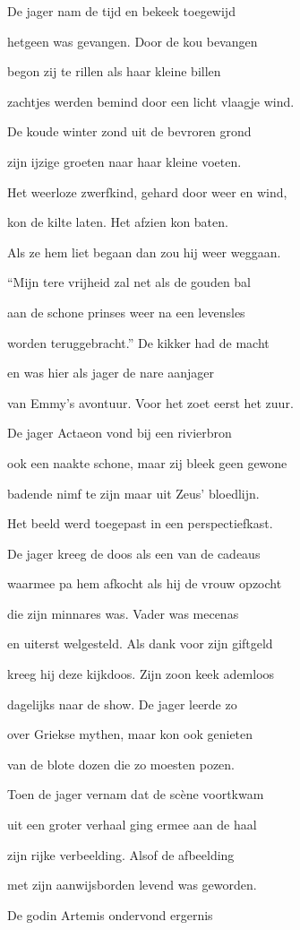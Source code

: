 De jager nam de tijd
en bekeek toegewijd

hetgeen was gevangen.
Door de kou bevangen

begon zij te rillen
als haar kleine billen

zachtjes werden bemind
door een licht vlaagje wind.

De koude winter zond
uit de bevroren grond

zijn ijzige groeten
naar haar kleine voeten.

Het weerloze zwerfkind,
gehard door weer en wind,

kon de kilte laten.
Het afzien kon baten.

Als ze hem liet begaan
dan zou hij weer weggaan.

“Mijn tere vrijheid zal
net als de gouden bal

aan de schone prinses
weer na een levensles

worden teruggebracht.”
De kikker had de macht

en was hier als jager
de nare aanjager

van Emmy’s avontuur.
Voor het zoet eerst het zuur.

De jager Actaeon
vond bij een rivierbron

ook een naakte schone,
maar zij bleek geen gewone

badende nimf te zijn
maar uit Zeus’ bloedlijn.

Het beeld werd toegepast
in een perspectiefkast.

De jager kreeg de doos
als een van de cadeaus

waarmee pa hem afkocht
als hij de vrouw opzocht

die zijn minnares was.
Vader was mecenas

en uiterst welgesteld.
Als dank voor zijn giftgeld

kreeg hij deze kijkdoos.
Zijn zoon keek ademloos

dagelijks naar de show.
De jager leerde zo

over Griekse mythen,
maar kon ook genieten

van de blote dozen
die zo moesten pozen.

Toen de jager vernam
dat de scène voortkwam

uit een groter verhaal
ging ermee aan de haal

zijn rijke verbeelding.
Alsof de afbeelding

met zijn aanwijsborden
levend was geworden.

De godin Artemis
ondervond ergernis

